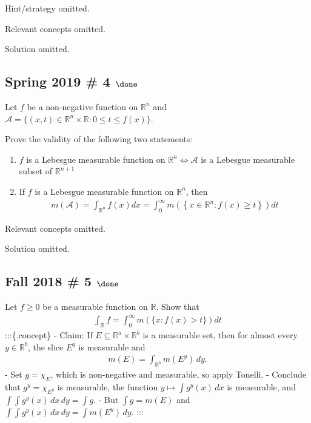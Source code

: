 Hint/strategy omitted.

Relevant concepts omitted.

Solution omitted.

\hypertarget{spring-2019-4-done}{%
\subsection{\texorpdfstring{Spring 2019 \# 4
\(\done\)}{Spring 2019 \# 4 \textbackslash done}}\label{spring-2019-4-done}}

Let \(f\) be a non-negative function on \({\mathbb{R}}^n\) and
\(\mathcal A = \{(x, t) ∈ {\mathbb{R}}^n \times {\mathbb{R}}: 0 ≤ t ≤ f (x)\}\).

Prove the validity of the following two statements:

\begin{enumerate}
\def\labelenumi{\alph{enumi}.}
\item
  \(f\) is a Lebesgue measurable function on
  \({\mathbb{R}}^n \iff \mathcal A\) is a Lebesgue measurable subset of
  \({\mathbb{R}}^{n+1}\)
\item
  If \(f\) is a Lebesgue measurable function on \({\mathbb{R}}^n\), then
  \begin{align*}
  m(\mathcal{A})=\int _{{\mathbb{R}}^{n}} f(x) d x=\int_{0}^{\infty} m\left(\left\{x \in {\mathbb{R}}^{n}: f(x) \geq t\right\}\right) dt
  \end{align*}
\end{enumerate}


Relevant concepts omitted.

Solution omitted.

\hypertarget{fall-2018-5-done}{%
\subsection{\texorpdfstring{Fall 2018 \# 5
\(\done\)}{Fall 2018 \# 5 \textbackslash done}}\label{fall-2018-5-done}}

Let \(f \geq 0\) be a measurable function on \({\mathbb{R}}\). Show that
\begin{align*}
\int _{{\mathbb{R}}} f = \int _{0}^{\infty} m(\{x: f(x)>t\}) dt
\end{align*}
:::\{.concept\} \envlist - Claim: If
\(E\subseteq {\mathbb{R}}^a \times{\mathbb{R}}^b\) is a measurable set,
then for almost every \(y\in {\mathbb{R}}^b\), the slice \(E^y\) is
measurable and
\begin{align*}
m(E) = \int_{{\mathbb{R}}^b} m(E^y) \,dy
.\end{align*}
- Set \(g = \chi_E\), which is non-negative and measurable, so apply
Tonelli. - Conclude that \(g^y = \chi_{E^y}\) is measurable, the
function \(y\mapsto \int g^y(x)\, dx\) is measurable, and
\(\int \int g^y(x)\,dx \,dy = \int g\). - But \(\int g = m(E)\) and
\(\int\int g^y(x) \,dx\,dy = \int m(E^y)\,dy\). :::

